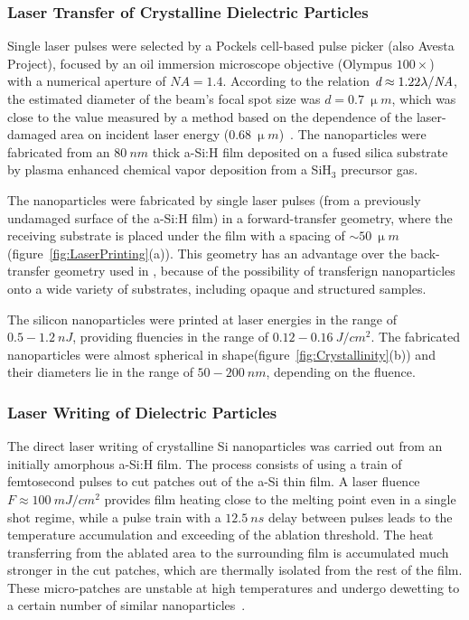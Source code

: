         \subsubsection{Laser Transfer of Crystalline Dielectric Particles}
                Single laser pulses were selected by a Pockels cell-based pulse picker (also Avesta Project),
            focused by an oil immersion microscope objective (Olympus $100\times$)
            with a numerical aperture of $\mathit{NA}=1.4$. According to the relation $\emph{d}\approx 1.22\lambda/\mathit{NA}$, the estimated
            diameter of the beam's focal spot size was $d=0.7~\si{\upmu m}$, which was close to the value measured by a method based on
            the dependence of the laser-damaged area on incident laser energy ($0.68~\si{\upmu m}$)~\cite{liu1982simple}.
            The nanoparticles were fabricated from an $80~\si{nm}$ thick a-Si:H film deposited on a fused silica substrate by
            plasma enhanced chemical vapor deposition from a SiH$_{3}$ precursor gas.

                The nanoparticles were fabricated by single laser pulses (from a previously undamaged surface of the a-Si:H film) in a
            forward-transfer geometry, where the receiving substrate is placed under the film with a spacing
            of $\sim 50~\si{\upmu m}$ (figure~\ref{fig:LaserPrinting}(a)). This geometry has an advantage over the back-transfer geometry
            used in \cite{zywietz2014laser}, because of the possibility of transferign nanoparticles onto a wide variety of substrates,
            including opaque and structured samples.

                The silicon nanoparticles were printed at laser energies in the range of $0.5-1.2~\si{nJ}$, providing fluencies in
            the range of $0.12-0.16~\si{J/cm^{2}}$. The fabricated nanoparticles were almost spherical in shape(figure~\ref{fig:Crystallinity}(b))
            and their diameters lie in the range of $50-200~\si{nm}$, depending on the fluence.

        \subsubsection{Laser Writing of Dielectric Particles}
                The direct laser writing of crystalline Si nanoparticles was carried out from an initially amorphous a-Si:H film.
            The process consists of using a train of femtosecond pulses to cut patches out of the a-Si thin film\cite{makarov2016controllable,
            dmitriev2016direct}. A laser fluence $F\approx100~\si{mJ/cm^{2}}$ provides film heating close to the melting point even in a
            single shot regime, while a pulse train with a $12.5~\si{ns}$ delay between pulses leads to the temperature accumulation
            and exceeding of the ablation threshold. The heat transferring from the ablated area to the surrounding film is accumulated
            much stronger in the cut patches, which are thermally isolated from the rest of the film.
            These micro-patches are unstable at high temperatures and undergo dewetting to a certain number of similar
            nanoparticles~\cite{thompson2012solid}.

